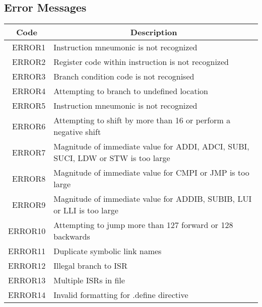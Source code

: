 \newpage
\subsection{Error Messages}
\begin{center}
	\centering
	\begin{tabular}{r|p{12cm}}
		\multicolumn{1}{c}{\bf Code} & \multicolumn{1}{c}{\bf Description} \\
		\hline\hline
		ERROR1& Instruction mneumonic is not recognized \\
		ERROR2& Register code within instruction is not recognized\\
		ERROR3& Branch condition code is not recognised\\
		ERROR4& Attempting to branch to undefined location \\
		ERROR5& Instruction mneumonic is not recognized \\
		ERROR6& Attempting to shift by more than 16 or perform a negative shift \\
		ERROR7& Magnitude of immediate value for ADDI, ADCI, SUBI, SUCI, LDW or STW is too large\\
		ERROR8& Magnitude of immediate value for CMPI or JMP is too large \\
		ERROR9& Magnitude of immediate value for ADDIB, SUBIB, LUI or LLI is too large \\
		ERROR10& Attempting to jump more than 127 forward or 128 backwards \\
		ERROR11& Duplicate symbolic link names \\
		ERROR12& Illegal branch to ISR \\
		ERROR13& Multiple ISRs in file \\
		ERROR14& Invalid formatting for .define directive \\
	\end{tabular}
\end{center}
